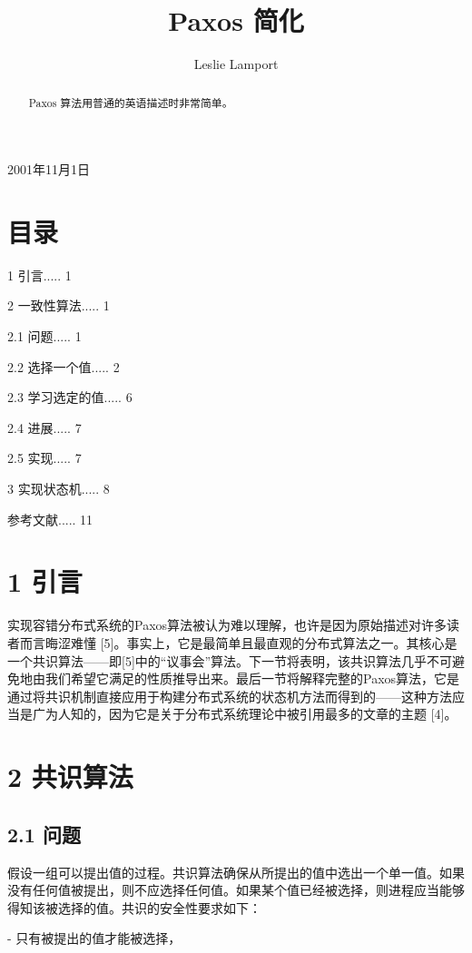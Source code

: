 \documentclass[12pt,a4paper]{report} %
\begin{document}
\title{Paxos 简化}

\author{Leslie Lamport}

2001年11月1日
\maketitle
\begin{abstract}

 Paxos 算法用普通的英语描述时非常简单。 \end{abstract}
\section*{目录}

1 引言..... 1

2 一致性算法..... 1

2.1 问题..... 1

2.2 选择一个值..... 2

2.3 学习选定的值..... 6

2.4 进展..... 7

2.5 实现..... 7

3 实现状态机..... 8

参考文献..... 11
\section*{1 引言}

实现容错分布式系统的Paxos算法被认为难以理解，也许是因为原始描述对许多读者而言晦涩难懂 [5]。事实上，它是最简单且最直观的分布式算法之一。其核心是一个共识算法——即[5]中的“议事会”算法。下一节将表明，该共识算法几乎不可避免地由我们希望它满足的性质推导出来。最后一节将解释完整的Paxos算法，它是通过将共识机制直接应用于构建分布式系统的状态机方法而得到的——这种方法应当是广为人知的，因为它是关于分布式系统理论中被引用最多的文章的主题 [4]。

\section*{2 共识算法}

\subsection*{2.1 问题}

假设一组可以提出值的过程。共识算法确保从所提出的值中选出一个单一值。如果没有任何值被提出，则不应选择任何值。如果某个值已经被选择，则进程应当能够得知该被选择的值。共识的安全性要求如下：

- 只有被提出的值才能被选择，
\end{document}
